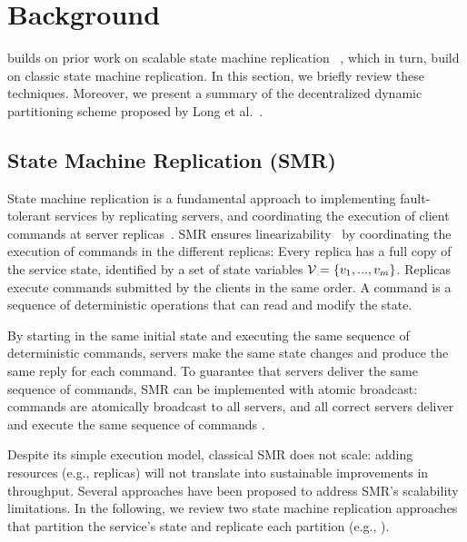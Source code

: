 \section{Background}
\label{sec:background}


\dynastar builds on
prior work on scalable state machine replication
~\cite{bezerra2014ssmr}, which in turn, build on classic
state machine replication. In this section, we briefly review these
techniques. Moreover, we present a summary of the decentralized
dynamic partitioning scheme proposed by Long et al.~\cite{hoang2016}.

\subsection{State Machine Replication (SMR)}
\label{sec:smr}

State machine replication is a fundamental approach to implementing fault-tolerant services by replicating servers, and coordinating the execution of client commands at server replicas~\cite{Lam78,Sch90}. 
SMR ensures linearizability~\cite{Attiya04} by coordinating the execution of commands in the different replicas: 
Every replica has a full copy of the service state, identified by a set of state variables $\mathcal{V} = \{v_1, ..., v_m\}$.
Replicas execute commands submitted by the clients in the same order. 
A command is a sequence of deterministic operations that can read and modify the state.

By starting in the same initial state and executing the same sequence of deterministic commands, servers make the same state changes and produce the same reply for each command. To guarantee that servers deliver the same sequence of commands, SMR can be implemented with atomic broadcast: commands are atomically broadcast to all servers, and all correct servers deliver and execute the same sequence of commands \cite{BJ87b,DSU04}.

Despite its simple execution model, classical SMR does not scale: adding resources (e.g., replicas) will not translate into sustainable improvements in throughput. 
%
Several approaches have been proposed to address SMR's scalability limitations. 
In the following, we review two state machine replication approaches that partition the service's state and replicate each partition (e.g., \cite{Glendenning:2011kj,Marandi:2011dj,hoang2016}).


